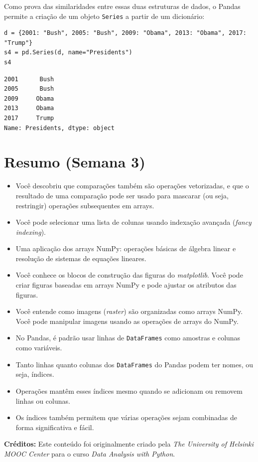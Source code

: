 \documentclass[11pt,a4paper]{article}
\begin{document}
Como prova das similaridades entre essas duas estruturas de dados, o Pandas permite a criação de um objeto \texttt{Series} a partir de um dicionário:

\begin{lstlisting}
d = {2001: "Bush", 2005: "Bush", 2009: "Obama", 2013: "Obama", 2017: "Trump"}
s4 = pd.Series(d, name="Presidents")
s4
\end{lstlisting}
\begin{verbatim}
2001      Bush
2005      Bush
2009     Obama
2013     Obama
2017     Trump
Name: Presidents, dtype: object
\end{verbatim}

\section{Resumo (Semana 3)}
\begin{itemize}
    \item Você descobriu que comparações também são operações vetorizadas, e que o resultado de uma comparação pode ser usado para mascarar (ou seja, restringir) operações subsequentes em arrays.
    \item Você pode selecionar uma lista de colunas usando indexação avançada (\textit{fancy indexing}).
    \item Uma aplicação dos arrays NumPy: operações básicas de álgebra linear e resolução de sistemas de equações lineares.
    \item Você conhece os blocos de construção das figuras do \textit{matplotlib}. Você pode criar figuras baseadas em arrays NumPy e pode ajustar os atributos das figuras.
    \item Você entende como imagens (\textit{raster}) são organizadas como arrays NumPy. Você pode manipular imagens usando as operações de arrays do NumPy.
    \item No Pandas, é padrão usar linhas de \texttt{DataFrames} como amostras e colunas como variáveis.
    \item Tanto linhas quanto colunas dos \texttt{DataFrames} do Pandas podem ter nomes, ou seja, índices.
    \item Operações mantêm esses índices mesmo quando se adicionam ou removem linhas ou colunas.
    \item Os índices também permitem que várias operações sejam combinadas de forma significativa e fácil.
\end{itemize}

\vspace{2em}
\noindent\textbf{Créditos:} Este conteúdo foi originalmente criado pela \textit{The University of Helsinki MOOC Center} para o curso \textit{Data Analysis with Python}.
\end{document}
